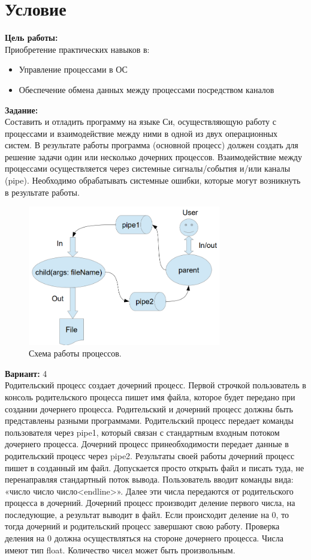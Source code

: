 \section{Условие}

{\bfseries Цель работы:} \\
Приобретение практических навыков в:
\begin{itemize}
\item Управление процессами в ОС
\item Обеспечение обмена данных между процессами посредством каналов
\end{itemize}

{\bfseries Задание:} \\
Составить и отладить программу на языке Си, осуществляющую работу с процессами и
взаимодействие между ними в одной из двух операционных систем. В результате работы
программа (основной процесс) должен создать для решение задачи один или несколько
дочерних процессов. Взаимодействие между процессами осуществляется через системные
сигналы/события и/или каналы (pipe).
Необходимо обрабатывать системные ошибки, которые могут возникнуть в результате работы.

\begin{figure}[h]
    \centering
    \includegraphics[width=0.75\textwidth]{src/shema.png}
    \caption{Схема работы процессов.}
    \label{fig:schema}
\end{figure}

{\bfseries Вариант:} 4 \\
Родительский процесс создает дочерний процесс. Первой строчкой пользователь в консоль
родительского процесса пишет имя файла, которое будет передано при создании дочернего
процесса. Родительский и дочерний процесс должны быть представлены разными программами.
Родительский процесс передает команды пользователя через pipe1, который связан с
стандартным входным потоком дочернего процесса. Дочерний процесс принеобходимости
передает данные в родительский процесс через pipe2. Результаты своей работы дочерний
процесс пишет в созданный им файл. Допускается просто открыть файл и писать туда, не
перенаправляя стандартный поток вывода.
Пользователь вводит команды вида: «число число число<endline>». Далее эти числа
передаются от родительского процесса в дочерний. Дочерний процесс производит деление первого числа, на последующие, а результат выводит в файл. Если происходит деление на 0, то
тогда дочерний и родительский процесс завершают свою работу. Проверка деления на 0 должна
осуществляться на стороне дочернего процесса. Числа имеют тип float. Количество чисел может
быть произвольным.